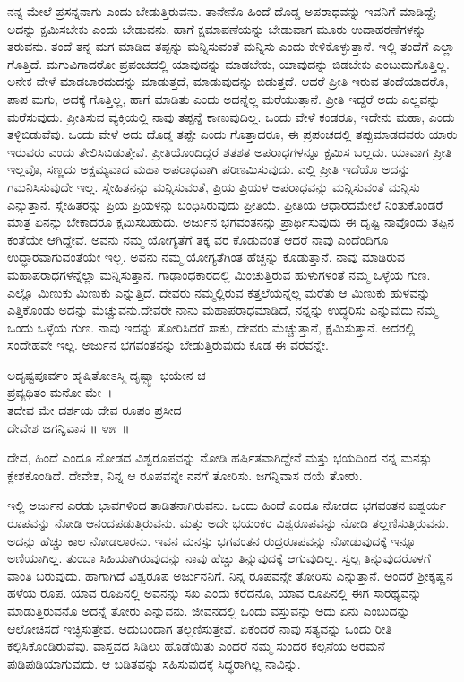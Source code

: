 ನನ್ನ ಮೇಲೆ ಪ್ರಸನ್ನನಾಗು ಎಂದು ಬೇಡುತ್ತಿರುವನು. ತಾನೇನೊ ಹಿಂದೆ ದೊಡ್ಡ ಅಪರಾಧವನ್ನು ಇವನಿಗೆ ಮಾಡಿದ್ದೆ; ಅದನ್ನು ಕ್ಷಮಿಸಬೇಕು ಎಂದು ಬೇಡುವನು. ಹಾಗೆ ಕ್ಷಮಾಪಣೆಯನ್ನು ಬೇಡುವಾಗ ಮೂರು ಉದಾಹರಣೆಗಳನ್ನು ತರುವನು. ತಂದೆ ತನ್ನ ಮಗ ಮಾಡಿದ ತಪ್ಪನ್ನು ಮನ್ನಿಸುವಂತೆ ಮನ್ನಿಸು ಎಂದು ಕೇಳಿಕೊಳ್ಳುತ್ತಾನೆ. ಇಲ್ಲಿ ತಂದೆಗೆ ಎಲ್ಲಾ ಗೊತ್ತಿದೆ. ಮಗುವಿ\-ಗಾದರೋ ಪ್ರಪಂಚದಲ್ಲಿ ಯಾವುದನ್ನು ಮಾಡಬೇಕು, ಯಾವುದನ್ನು ಬಿಡಬೇಕು ಎಂಬುದು\break ಗೊತ್ತಿಲ್ಲ. ಅನೇಕ ವೇಳೆ ಮಾಡಬಾರದುದನ್ನು ಮಾಡುತ್ತದೆ, ಮಾಡುವುದನ್ನು ಬಿಡುತ್ತದೆ. ಆದರೆ ಪ್ರೀತಿ ಇರುವ ತಂದೆಯಾದರೊ, ಪಾಪ ಮಗು, ಅದಕ್ಕೆ ಗೊತ್ತಿಲ್ಲ, ಹಾಗೆ ಮಾಡಿತು ಎಂದು ಅದನ್ನೆಲ್ಲ ಮರೆಯುತ್ತಾನೆ. ಪ್ರೀತಿ ಇದ್ದರೆ ಅದು ಎಲ್ಲವನ್ನು ಮರೆಸುವುದು. ಪ್ರೀತಿಸುವ ವ್ಯಕ್ತಿಯಲ್ಲಿ ನಾವು ತಪ್ಪನ್ನೆ ಕಾಣುವುದಿಲ್ಲ. ಒಂದು ವೇಳೆ ಕಂಡರೂ, ಇದೇನು ಮಹಾ, ಎಂದು ತಳ್ಳಿಬಿಡುವೆವು. ಒಂದು ವೇಳೆ ಅದು ದೊಡ್ಡ ತಪ್ಪೇ ಎಂದು ಗೊತ್ತಾದರೂ, ಈ ಪ್ರಪಂಚದಲ್ಲಿ ತಪ್ಪುಮಾಡದವರು ಯಾರು ಇರುವರು ಎಂದು ತೇಲಿಸಿಬಿಡುತ್ತೇವೆ. ಪ್ರೀತಿಯೊಂದಿದ್ದರೆ ಶತಶತ ಅಪರಾಧಗಳನ್ನೂ ಕ್ಷಮಿಸ ಬಲ್ಲದು. ಯಾವಾಗ ಪ್ರೀತಿ ಇಲ್ಲವೊ, ಸಣ್ಣದು ಅಕ್ಷಮ್ಯವಾದ ಮಹಾ ಅಪರಾಧವಾಗಿ ಪರಿಣಮಿಸುವುದು. ಎಲ್ಲಿ ಪ್ರೀತಿ ಇದೆಯೊ ಅದನ್ನು ಗಮನಿಸಿಸುವುದೇ ಇಲ್ಲ. ಸ್ನೇಹಿತನನ್ನು ಮನ್ನಿಸುವಂತೆ, ಪ್ರಿಯ ಪ್ರಿಯಳ ಅಪರಾಧವನ್ನು ಮನ್ನಿಸುವಂತೆ ಮನ್ನಿಸು ಎನ್ನುತ್ತಾನೆ. ಸ್ನೇಹಿತರನ್ನು ಪ್ರಿಯ ಪ್ರಿಯಳನ್ನು ಬಂಧಿಸಿರುವುದು ಪ್ರೀತಿಯೆ. ಪ್ರೀತಿಯ ಆಧಾರದಮೇಲೆ ನಿಂತುಕೊಂಡರೆ ಮಾತ್ರ ಏನನ್ನು ಬೇಕಾದರೂ ಕ್ಷಮಿಸಬಹುದು. ಅರ್ಜುನ ಭಗವಂತನನ್ನು ಪ್ರಾರ್ಥಿಸುವುದು ಈ ದೃಷ್ಟಿ ನಾವೊಂದು ತಪ್ಪಿನ ಕಂತೆಯೇ ಆಗಿದ್ದೇವೆ. ಅವನು ನಮ್ಮ ಯೋಗ್ಯತೆಗೆ ತಕ್ಕ ವರ ಕೊಡುವಂತೆ ಆದರೆ ನಾವು ಎಂದೆಂದಿಗೂ ಉದ್ಧಾರವಾಗುವಂತೆಯೇ ಇಲ್ಲ. ಅವನು ನಮ್ಮ ಯೋಗ್ಯತೆಗಿಂತ ಹೆಚ್ಚನ್ನು ಕೊಡುತ್ತಾನೆ. ನಾವು ಮಾಡಿರುವ ಮಹಾಪರಾಧಗಳನ್ನೆಲ್ಲಾ ಮನ್ನಿಸುತ್ತಾನೆ. ಗಾಢಾಂಧಕಾರದಲ್ಲಿ ಮಿಂಚುತ್ತಿರುವ ಹುಳುಗಳಂತೆ ನಮ್ಮ ಒಳ್ಳೆಯ ಗುಣ. ಎಲ್ಲೊ ಮಿಣುಕು ಮಿಣುಕು ಎನ್ನುತ್ತಿದೆ. ದೇವರು ನಮ್ಮಲ್ಲಿರುವ ಕತ್ತಲೆಯನ್ನೆಲ್ಲ ಮರೆತು ಆ ಮಿಣುಕು ಹುಳವನ್ನು ಎತ್ತಿಕೊಂಡು ಅದನ್ನು ಮೆಚ್ಚುವನು.ದೇವರೇ ನಾನು ಮಹಾಪರಾಧಮಾಡಿದೆ, ನನ್ನನ್ನು ಉದ್ಧರಿಸು ಎನ್ನುವುದು ನಮ್ಮ ಒಂದು ಒಳ್ಳೆಯ ಗುಣ. ನಾವು ಇದನ್ನು ತೋರಿಸಿದರೆ ಸಾಕು, ದೇವರು ಮೆಚ್ಚುತ್ತಾನೆ, ಕ್ಷಮಿಸುತ್ತಾನೆ. ಅದರಲ್ಲಿ ಸಂದೇಹವೇ ಇಲ್ಲ. ಅರ್ಜುನ ಭಗವಂತನನ್ನು ಬೇಡುತ್ತಿರುವುದು ಕೂಡ ಈ ವರವನ್ನೇ.

\begin{shloka}
ಅದೃಷ್ಟಪೂರ್ವಂ ಹೃಷಿತೋಽಸ್ಮಿ ದೃಷ್ಟ್ವಾ ಭಯೇನ ಚ\\ ಪ್ರವ್ಯಥಿತಂ ಮನೋ ಮೇ~।\\ತದೇವ ಮೇ ದರ್ಶಯ ದೇವ ರೂಪಂ ಪ್ರಸೀದ\\ ದೇವೇಶ ಜಗನ್ನಿವಾಸ \hfill॥ ೪೫~॥
\end{shloka}

ದೇವ, ಹಿಂದೆ ಎಂದೂ ನೋಡದ ವಿಶ್ವರೂಪವನ್ನು ನೋಡಿ ಹರ್ಷಿತವಾಗಿದ್ದೇನೆ ಮತ್ತು ಭಯದಿಂದ ನನ್ನ ಮನಸ್ಸು ಕ್ಲೇಶಕೊಂಡಿದೆ. ದೇವೇಶ, ನಿನ್ನ ಆ ರೂಪವನ್ನೇ ನನಗೆ ತೋರಿಸು. ಜಗನ್ನಿವಾಸ ದಯೆ ತೋರು.

ಇಲ್ಲಿ ಅರ್ಜುನ ಎರಡು ಭಾವಗಳಿಂದ ತಾಡಿತನಾಗಿರುವನು. ಒಂದು ಹಿಂದೆ ಎಂದೂ ನೋಡದ ಭಗವಂತನ ಐಶ್ವರ್ಯ ರೂಪವನ್ನು ನೋಡಿ ಆನಂದಪಡುತ್ತಿರುವನು. ಮತ್ತು ಅದೇ ಭಯಂಕರ ವಿಶ್ವರೂಪವನ್ನು ನೋಡಿ ತಲ್ಲಣಿಸುತ್ತಿರುವನು. ಅದನ್ನು ಹೆಚ್ಚು ಕಾಲ ನೋಡಲಾರನು. ಇವನ ಮನಸ್ಸು ಭಗವಂತನ ರುದ್ರರೂಪವನ್ನು ನೋಡುವುದಕ್ಕೆ ಇನ್ನೂ ಅಣಿಯಾಗಿಲ್ಲ. ತುಂಬಾ ಸಿಹಿಯಾಗಿರುವುದನ್ನು ನಾವು ಹೆಚ್ಚು ತಿನ್ನುವುದಕ್ಕೆ ಆಗುವುದಿಲ್ಲ. ಸ್ವಲ್ಪ ತಿನ್ನುವುದರೊಳಗೆ ವಾಂತಿ ಬರುವುದು. ಹಾಗಾಗಿದೆ ವಿಶ್ವರೂಪ ಅರ್ಜುನನಿಗೆ. ನಿನ್ನ ರೂಪವನ್ನೇ ತೋರಿಸು ಎನ್ನುತ್ತಾನೆ. ಅಂದರೆ ಶ‍್ರೀಕೃಷ್ಣನ ಹಳೆಯ ರೂಪ. ಯಾವ ರೂಪಿನಲ್ಲಿ ಅವನನ್ನು ಸಖ ಎಂದು ಕರೆದನೊ, ಯಾವ ರೂಪಿನಲ್ಲಿ ಈಗ ಸಾರಥ್ಯವನ್ನು ಮಾಡುತ್ತಿರುವನೊ ಅದನ್ನೆ ತೋರು ಎನ್ನುವನು. ಜೀವನದಲ್ಲಿ ಒಂದು ವಸ್ತುವನ್ನು ಅದು ಏನು ಎಂಬುದನ್ನು ಆಲೋಚಿಸದೆ ಇಚ್ಛಿಸುತ್ತೇವ. ಅದು\break ಬಂದಾಗ ತಲ್ಲಣಿಸುತ್ತೇವೆ. ಏಕೆಂದರೆ ನಾವು ಸತ್ಯವನ್ನು ಒಂದು ರೀತಿ ಕಲ್ಪಿಸಿಕೊಂಡಿರುವೆವು. ವಾಸ್ತವದ ಸಿಡಿಲು ಹೊಡೆಯಿತು ಎಂದರೆ ನಮ್ಮ ಸುಂದರ ಕಲ್ಪನೆಯ ಅರಮನೆ ಪುಡಿಪುಡಿಯಾಗುವುದು. ಆ ಬಡಿತವನ್ನು ಸಹಿಸುವುದಕ್ಕೆ ಸಿದ್ಧರಾಗಿಲ್ಲ ನಾವಿನ್ನು.

